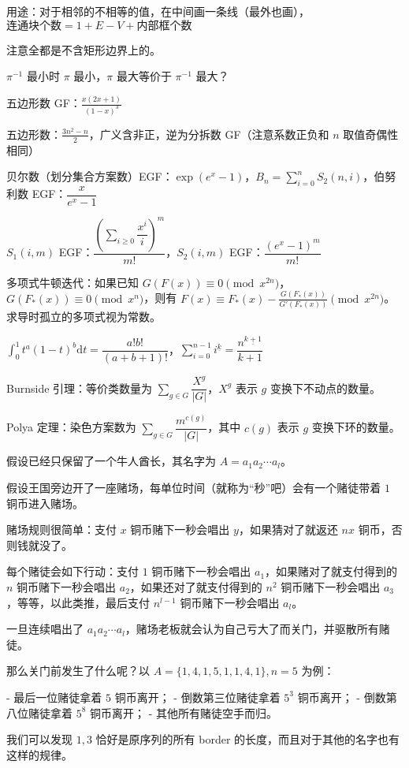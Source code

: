 \documentclass[12pt]{ctexart}
\begin{document}
用途：对于相邻的不相等的值，在中间画一条线（最外也画），$\text{连通块个数}=1+E-V+内部框个数$

注意全都是不含矩形边界上的。

$\pi^{-1}$ 最小时 $\pi$ 最小，$\pi$ 最大等价于 $\pi^{-1}$ 最大？

五边形数 GF：$\frac{x(2x+1)}{(1-x)^3}$

五边形数：$\frac{3n^2-n}2$，广义含非正，逆为分拆数 GF（注意系数正负和 $n$ 取值奇偶性相同）

贝尔数（划分集合方案数）EGF：$\exp(e^x-1)$，$B_n=\sum\limits_{i=0}^n S_2(n,i)$，伯努利数 EGF：$\dfrac{x}{e^x-1}$

$S_1(i,m)$ EGF：$\dfrac{(\sum\limits_{i\ge 0}\dfrac{x^i}i)^m}{m!}$，$S_2(i,m)$ EGF：$\dfrac{(e^x-1)^m}{m!}$

多项式牛顿迭代：如果已知 $G(F(x))\equiv0\pmod{x^{2n}}$，$G(F_*(x))\equiv0\pmod {x^n}$，则有 $F(x)\equiv F_*(x)-\frac{G(F_*(x))}{G'(F_*(x))}\pmod{x^{2n}}$。求导时孤立的多项式视为常数。

$\int_0^1 t^a(1-t)^b\mathrm{d}t=\dfrac{a!b!}{(a+b+1)!}$，$\sum\limits_{i=0}^{n-1}i^{\underline{k}}=\dfrac{n^{\underline{k+1}}}{k+1}$

Burnside 引理：等价类数量为 $\sum\limits_{g\in G}\dfrac{X^g}{|G|}$，$X^g$ 表示 $g$ 变换下不动点的数量。

Polya 定理：染色方案数为 $\sum\limits_{g\in G}\dfrac{m^{c(g)}}{|G|}$，其中 $c(g)$ 表示 $g$ 变换下环的数量。

假设已经只保留了一个牛人酋长，其名字为 $A=a_1a_2\cdots a_l$。

假设王国旁边开了一座赌场，每单位时间（就称为“秒”吧）会有一个赌徒带着 $1$ 铜币进入赌场。

赌场规则很简单：支付 $x$ 铜币赌下一秒会唱出 $y$，如果猜对了就返还 $nx$ 铜币，否则钱就没了。

每个赌徒会如下行动：支付 $1$ 铜币赌下一秒会唱出 $a_1$，如果赌对了就支付得到的 $n$ 铜币赌下一秒会唱出 $a_2$，如果还对了就支付得到的 $n^2$ 铜币赌下一秒会唱出 $a_3$，等等，以此类推，最后支付 $n^{l-1}$ 铜币赌下一秒会唱出 $a_l$。

一旦连续唱出了 $a_1a_2\cdots a_l$，赌场老板就会认为自己亏大了而关门，并驱散所有赌徒。

那么关门前发生了什么呢？以 $A=\{1,4,1,5,1,1,4,1\},n=5$ 为例：

- 最后一位赌徒拿着 $5$ 铜币离开；
- 倒数第三位赌徒拿着 $5^3$ 铜币离开；
- 倒数第八位赌徒拿着 $5^8$ 铜币离开；
- 其他所有赌徒空手而归。

我们可以发现 $1,3$ 恰好是原序列的所有 border 的长度，而且对于其他的名字也有这样的规律。
\end{document}
